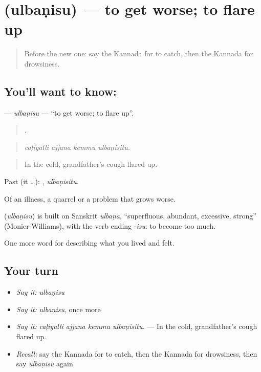 \section[\texorpdfstring{\kn{ಉಲ್ಬಣಿಸು} (ulbaṇisu)}{ಉಲ್ಬಣಿಸು (ulbaṇisu)}]{ (ulbaṇisu) — to get worse; to flare up}

\label{lesson:KA-C511-ulbanisu}



\begin{quote}
Before the new one: say the Kannada for to catch, then the Kannada for drowsiness.
\end{quote}

\subsection*{You'll want to know: }
\textbf{} — \emph{ulbaṇisu} — \textquotedblleft{}to get worse; to flare up\textquotedblright{}.

\begin{quote}
   .
\end{quote}

\begin{quote}
\emph{caḷiyalli ajjana kemmu ulbaṇisitu.}
\end{quote}

\begin{quote}
In the cold, grandfather's cough flared up.
\end{quote}

Past (it …): , \emph{ulbaṇisitu}.

Of an illness, a quarrel or a problem that grows worse.

\begin{cousinweb}
\textbf{} (\emph{ulbaṇisu}) is built on Sanskrit \emph{ulbaṇa}, \textquotedblleft{}superfluous, abundant, excessive, strong\textquotedblright{} (Monier-Williams), with the verb ending -\emph{isu}: to become too much.
\end{cousinweb}

\begin{grammarlens}[title={What you've built}]
One more word for describing what you lived and felt.
\end{grammarlens}

\subsection*{Your turn}
\begin{itemize}
\raggedright
  \item \emph{Say it:} \emph{ulbaṇisu}
  \item \emph{Say it:} \emph{ulbaṇisu}, once more
  \item \emph{Say it:} \emph{caḷiyalli ajjana kemmu ulbaṇisitu.} — In the cold, grandfather's cough flared up.
  \item \emph{Recall:} say the Kannada for to catch, then the Kannada for drowsiness, then say \emph{ulbaṇisu} again
\end{itemize}

